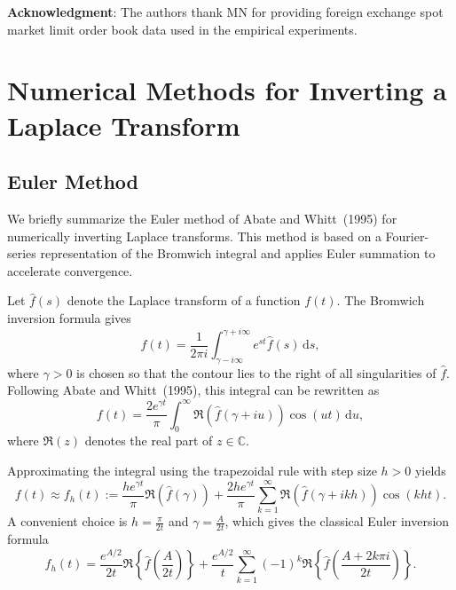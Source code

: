 \documentclass[11pt]{article}
\begin{document}
\textbf{Acknowledgment}: The authors thank MN for providing foreign exchange spot market limit order book data used in the empirical experiments.

\appendix

\section{Numerical Methods for Inverting a Laplace Transform}\label{numericalappendix}

\subsection{Euler Method}\label{appendix:euler_method}

We briefly summarize the Euler method of Abate and Whitt~(1995) for numerically inverting Laplace transforms. 
This method is based on a Fourier-series representation of the Bromwich integral and applies Euler summation to accelerate convergence.

Let $\hat{f}(s)$ denote the Laplace transform of a function $f(t)$. The Bromwich inversion formula gives
\begin{equation}
    f(t)
    =
    \frac{1}{2\pi i}
    \int_{\gamma-i\infty}^{\gamma+i\infty}
    e^{st}\hat{f}(s)\,\mathrm{d}s,
\end{equation}
where $\gamma>0$ is chosen so that the contour lies to the right of all singularities of $\hat{f}$.
Following Abate and Whitt~(1995), this integral can be rewritten as
\begin{equation}
    f(t)
    =
    \frac{2e^{\gamma t}}{\pi}
    \int_0^\infty
    \Re\!\left(\hat{f}(\gamma+iu)\right)\cos(ut)\,\mathrm{d}u,
\end{equation}
where $\Re(z)$ denotes the real part of $z\in\mathbb{C}$.

Approximating the integral using the trapezoidal rule with step size $h>0$ yields
\begin{equation}
    f(t)
    \approx
    f_h(t)
    :=
    \frac{he^{\gamma t}}{\pi}
    \Re\!\left(\hat{f}(\gamma)\right)
    +
    \frac{2he^{\gamma t}}{\pi}
    \sum_{k=1}^{\infty}
    \Re\!\left(\hat{f}(\gamma+ikh)\right)\cos(kht).
\end{equation}
A convenient choice is $h=\frac{\pi}{2t}$ and $\gamma=\frac{A}{2t}$, which gives the classical Euler inversion formula
\begin{equation}\label{EulerAbate}
    f_h(t)
    =
    \frac{e^{A/2}}{2t}
    \Re\!\left\{
    \hat{f}\!\left(\frac{A}{2t}\right)
    \right\}
    +
    \frac{e^{A/2}}{t}
    \sum_{k=1}^{\infty}
    (-1)^k
    \Re\!\left\{
    \hat{f}\!\left(\frac{A+2k\pi i}{2t}\right)
    \right\}.
\end{equation}
\end{document}
